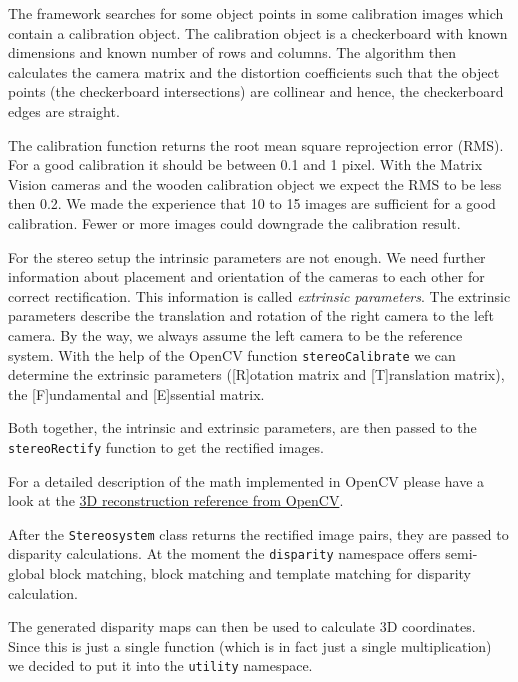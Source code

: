 \documentclass[11pt]{article}
\begin{document}
The framework searches for some object points  in some calibration images which contain a calibration object. The calibration object is a checkerboard with known dimensions and known number of rows and columns. The algorithm then calculates the camera matrix and the distortion coefficients such that the object points (the checkerboard intersections)  are collinear and hence, the checkerboard edges are straight.%

The calibration function returns the root mean square reprojection error (RMS). For a good calibration it should be between 0.1 and 1 pixel. With the Matrix Vision cameras and the wooden calibration object we expect the RMS to be less then 0.2. We made the experience that 10 to 15 images are sufficient for a good calibration. Fewer or more images could downgrade the calibration result. 


For the stereo setup the intrinsic parameters are not enough. We need further information about placement and orientation of the cameras to each other for correct rectification. This information is called \emph{extrinsic parameters}. The extrinsic parameters describe the translation and rotation of the right camera to the left camera. By the way, we always assume the left camera to be the reference system. With the help of the OpenCV function \texttt{stereoCalibrate} we can determine the extrinsic parameters ([R]otation matrix and [T]ranslation matrix), the [F]undamental and [E]ssential matrix.

Both together, the intrinsic and extrinsic parameters, are then passed to the \texttt{stereoRectify} function to get the rectified images.%

\bigskip
For a detailed description of the math implemented in OpenCV please have a look at the \href{http://docs.opencv.org/modules/calib3d/doc/camera_calibration_and_3d_reconstruction.html}{3D reconstruction reference from OpenCV}.
\bigskip

After the \texttt{Stereosystem} class returns the rectified image pairs, they are passed to disparity calculations. At the moment the \texttt{disparity} namespace offers semi-global block matching, block matching and template matching for disparity calculation.

The generated disparity maps can then be used to calculate 3D coordinates. Since this is just a single function (which is in fact just a single multiplication) we decided to put it into the \texttt{utility} namespace.
\end{document}
